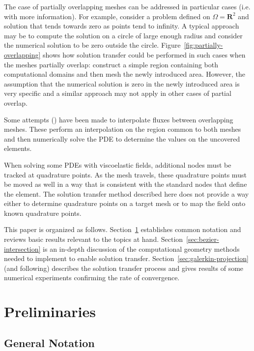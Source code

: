 \documentclass[oneside, reqno]{amsart}
\theoremstyle{definition}
\newcommand{\reals}{\mathbf{R}}
\begin{document}
The case of partially overlapping meshes can be addressed in particular
cases (i.e. with more information). For example, consider a problem
defined on \(\Omega = \reals^2\) and solution
that tends towards zero as points tend to infinity. A typical approach
may be to compute the solution on a circle of large enough radius and
consider the numerical solution to be zero outside the circle.
Figure~\ref{fig:partially-overlapping} shows how solution transfer could be
performed in such cases when the meshes partially overlap: construct a
simple region containing both computational domains and then mesh the
newly introduced area. However, the assumption that the numerical solution
is zero in the newly introduced area is very specific and
a similar approach may not apply in other cases of partial overlap.

Some attempts (\cite{Berger1987, Chesshire1994, Cai1999}) have been
made to interpolate fluxes between overlapping meshes. These perform
an interpolation on the region common to both meshes and then numerically
solve the PDE to determine the values on the uncovered elements.

When solving some PDEs with viscoelastic fields, additional nodes must be
tracked at quadrature points. As the mesh travels, these quadrature points
must be moved as well in a way that is consistent with the standard
nodes that define the element. The solution transfer method described here
does not provide a way either to determine quadrature points on a
target mesh or to map the field onto known quadrature points.

This paper is organized as follows. Section~\ref{sec:preliminaries}
establishes common notation and reviews basic results relevant to the
topics at hand. Section~\ref{sec:bezier-intersection} is an
in-depth discussion of the computational geometry methods needed
to implement to enable solution transfer. Section~\ref{sec:galerkin-projection}
(and following)
describes the solution transfer process and gives results of some
numerical experiments confirming the rate of convergence.

\section{Preliminaries}\label{sec:preliminaries}

\subsection{General Notation}
\end{document}
